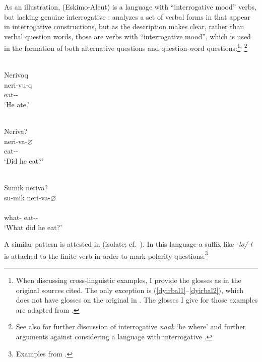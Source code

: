 \documentclass[output=paper]{langsci/langscibook}
\begin{document}
As an illustration,  (Eskimo-Aleut) is a language with
``interrogative mood'' verbs, but lacking genuine interrogative :
\citet[199]{sadock1984} analyzes a set of verbal forms in  that
appear in interrogative constructions, but as the description makes clear,
rather than verbal question words, those are verbs with ``interrogative mood'',
which is used in the formation of both alternative questions and question-word
questions:\footnote{When discussing cross-linguistic examples, I provide the
glosses as in the original sources cited. The only exception is 
(\ref{dyirbal1}--\ref{dyirbal2}), which does not have glosses on the original in
\citet{Dixon1972}. The glosses I give for those examples are adapted from
\citet{hagege2008}.}\textsuperscript{,}%
\footnote{See also \citet{hagege2008} for further
discussion of interrogative \emph{naak} `be where' and further arguments
against considering  a language with interrogative .}

\begin{exe}
    \ex\label{WG1} \\%
    \glll  Nerivoq\\
           neri-vu-q\\
           eat-\Indic{}-\Tsg{}\\
    \glt `He ate.'

    \ex\label{WG2} \\
      \glll Neriva?\\
            neri-va-$\varnothing$\\
            eat-\Int{}-\Tsg{}\\
    \glt    `Did he eat?'

    \ex \label{WG3} \\
       \gll Sumik neriva? \\
            su-mik neri-va-$\varnothing$\\ \hfill \\
            what-\Ins{} eat-\Int{}-\Tsg{}\\
    \glt `What did he eat?'
\end{exe}

A similar pattern is attested in  (isolate; cf.\
\citealt{gruzdeva1998,nedjalkov.otaina2013}). In this language a suffix like
\emph{-lo/-l} is attached to the finite verb in order to mark polarity
questions:\footnote{Examples from \citet[116 and 137]{nedjalkov.otaina2013}.}
\end{document}

